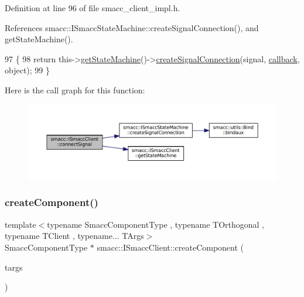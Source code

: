 Definition at line 96 of file smacc\+\_\+client\+\_\+impl.\+h.



References smacc\+::\+I\+Smacc\+State\+Machine\+::create\+Signal\+Connection(), and get\+State\+Machine().


\begin{DoxyCode}
97     \{
98         \textcolor{keywordflow}{return} this->\hyperlink{classsmacc_1_1ISmaccClient_aec51d4712404cb9882b86e4c854bb93a}{getStateMachine}()->\hyperlink{classsmacc_1_1ISmaccStateMachine_adf0f42ade0c65cc471960fe2a7c42da2}{createSignalConnection}(signal,
       \hyperlink{sm__ridgeback__barrel__search__1_2servers_2opencv__perception__node_2opencv__perception__node_8cpp_a050e697bd654facce10ea3f6549669b3}{callback}, \textcolor{keywordtype}{object});
99     \}
\end{DoxyCode}
Here is the call graph for this function\+:
\nopagebreak
\begin{figure}[H]
\begin{center}
\leavevmode
\includegraphics[width=350pt]{classsmacc_1_1ISmaccClient_addce4ebcdebc5a7a3f80c0980862575d_cgraph}
\end{center}
\end{figure}
\mbox{\label{classsmacc_1_1ISmaccClient_a5c1c8eb5e91a3b399662a52cb0ca86aa}} 
\subsubsection{\texorpdfstring{create\+Component()}{createComponent()}}
{\footnotesize\ttfamily template$<$typename Smacc\+Component\+Type , typename T\+Orthogonal , typename T\+Client , typename... T\+Args$>$ \\
Smacc\+Component\+Type $\ast$ smacc\+::\+I\+Smacc\+Client\+::create\+Component (\begin{DoxyParamCaption}\item[{T\+Args...}]{targs }\end{DoxyParamCaption})\hspace{0.3cm}{\ttfamily [protected]}}



